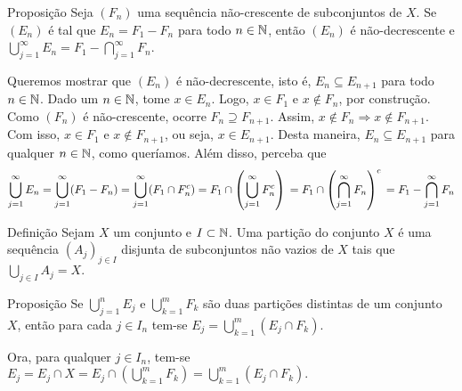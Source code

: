 \begin{env}{Proposição}
\label{prop:sequencia-decrescente-conjuntos-resultado-A_n}
Seja $(F_n)$ uma sequência não-crescente de subconjuntos de $X$. 
Se $(E_n)$ é tal que $E_n = F_1 - F_n$ para todo $n \in \operatorname{\mathbb{N}}$, então $(E_n)$ é não-decrescente e 
$\displaystyle \bigcup_{j = 1}^\infty E_n = \displaystyle F_1 - \bigcap_{j = 1}^\infty F_n$.
\end{env}

\begin{prova}
    Queremos mostrar que $(E_n)$ é não-decrescente, isto é, $E_n \subseteq E_{n+1}$ para todo $n \in \operatorname{\mathbb{N}}$.
    Dado um $n \in \operatorname{\mathbb{N}}$, tome $x \in E_n$. 
    Logo, $x \in F_1$ e $x \notin F_n$, por construção.
    Como $(F_n)$ é não-crescente, ocorre $F_{n} \supseteq F_{n+1}$. 
    Assim, $x \notin F_n \Rightarrow x \notin F_{n+1}$.
    Com isso, $x \in F_1$ e $x \notin F_{n+1}$, ou seja,
    $x \in E_{n+1}$.
    Desta maneira, $E_n \subseteq E_{n+1}$ para qualquer $n \in \operatorname{\mathbb{N}}$, como queríamos.
    Além disso, perceba que
$$
    	\bigcup_{j = 1}^\infty E_n 
    	= 
    	\bigcup_{j = 1}^\infty (F_1-F_n)\\
    	= 
    	\bigcup_{j = 1}^\infty (F_1 \cap F_n^c)\\
    	= 
    	F_1 \cap \left(\bigcup_{j = 1}^\infty F_n^c\right)\\
    	= 
    	F_1 \cap \left(\bigcap_{j = 1}^\infty F_n\right)^c\\
    	= 
    	F_1 -\bigcap_{j = 1}^\infty F_n
$$
\vspace{-1cm}
\end{prova}

\begin{env}{Definição}
	Sejam $X$ um conjunto e $I \subset \operatorname{\mathbb{N}}$.
	Uma partição do conjunto $X$ é uma sequência $(A_j)_{j \in I}$ disjunta de subconjuntos não vazios de $X$ tais que
	$
	\displaystyle\bigcup_{j \in I} A_j = X.
	$
\vspace{-0.4cm}
\end{env}

\begin{env}{Proposição}
	\label{prop: duas partições}
	Se $\displaystyle \bigcup_{j = 1}^n E_j$ e $\displaystyle \bigcup_{k = 1}^m F_k$ são duas partições distintas de um conjunto $X$, então
	para cada $j \in I_n$ tem-se $E_j = \displaystyle \bigcup_{k = 1}^m (E_j \cap F_k)$.
\end{env}
\begin{prova}
	Ora, para qualquer $j \in I_n$, tem-se 
	$\displaystyle
	E_j 
	= E_j \cap X 
	= E_j \cap \left(\bigcup_{k = 1}^m F_k\right)
	=
	\bigcup_{k = 1}^m \left(E_j \cap F_k\right).
	$
\end{prova}


